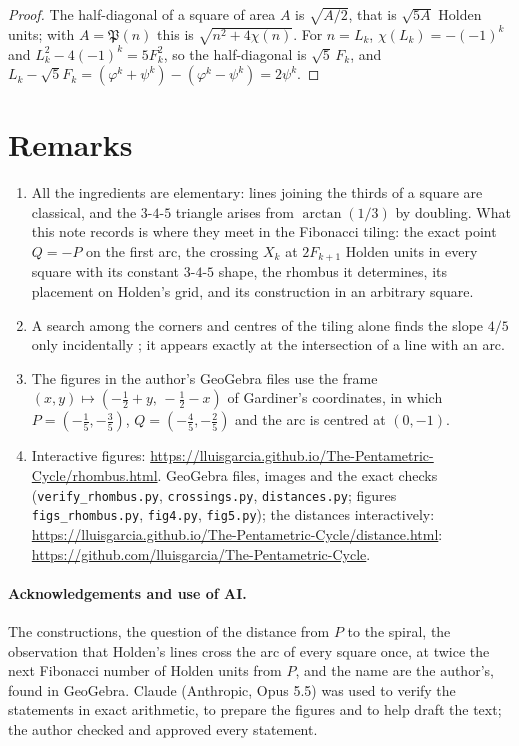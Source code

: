 \documentclass[11pt,a4paper]{article}
\theoremstyle{plain}
\theoremstyle{definition}
\theoremstyle{remark}
\begin{document}
\begin{proof}
The half-diagonal of a square of area $A$ is $\sqrt{A/2}$, that is $\sqrt{5A}$ Holden units; with $A=\mathfrak{P}(n)$ this is $\sqrt{n^2+4\chi(n)}$. For $n=L_k$, $\chi(L_k)=-(-1)^k$ and $L_k^2-4(-1)^k=5F_k^2$, so the half-diagonal is $\sqrt5\,F_k$, and $L_k-\sqrt5F_k=(\varphi^k+\psi^k)-(\varphi^k-\psi^k)=2\psi^k$.
\end{proof}

\section{Remarks}

\begin{enumerate}[leftmargin=*,itemsep=2pt]
\item All the ingredients are elementary: lines joining the thirds of a square are classical, and the $3$-$4$-$5$ triangle arises from $\arctan(1/3)$ by doubling. What this note records is where they meet in the Fibonacci tiling: the exact point $Q=-P$ on the first arc, the crossing $X_k$ at $2F_{k+1}$ Holden units in every square with its constant $3$-$4$-$5$ shape, the rhombus it determines, its placement on Holden's grid, and its construction in an arbitrary square.
\item A search among the corners and centres of the tiling alone finds the slope $4/5$ only incidentally \cite{site}; it appears exactly at the intersection of a line with an arc.
\item The figures in the author's GeoGebra files use the frame $(x,y)\mapsto(-\tfrac12+y,\,-\tfrac12-x)$ of Gardiner's coordinates, in which $P=(-\tfrac15,-\tfrac35)$, $Q=(-\tfrac45,-\tfrac25)$ and the arc is centred at $(0,-1)$.
\item Interactive figures: \url{https://lluisgarcia.github.io/The-Pentametric-Cycle/rhombus.html}. GeoGebra files, images and the exact checks (\texttt{verify\_rhombus.py}, \texttt{crossings.py}, \texttt{distances.py}; figures \texttt{figs\_rhombus.py}, \texttt{fig4.py}, \texttt{fig5.py}); the distances interactively: \url{https://lluisgarcia.github.io/The-Pentametric-Cycle/distance.html}: \url{https://github.com/lluisgarcia/The-Pentametric-Cycle}.
\end{enumerate}

\paragraph{Acknowledgements and use of AI.} The constructions, the question of the distance from $P$ to the spiral, the observation that Holden's lines cross the arc of every square once, at twice the next Fibonacci number of Holden units from $P$, and the name are the author's, found in GeoGebra. Claude (Anthropic, Opus 5.5) was used to verify the statements in exact arithmetic, to prepare the figures and to help draft the text; the author checked and approved every statement.
\end{document}
